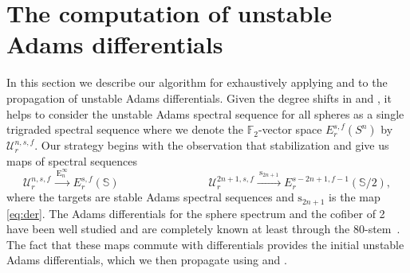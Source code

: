 \documentclass[dvipsnames,table]{amsart}
\theoremstyle{definition}
\theoremstyle{remark}
\numberwithin{equation}{section}
\begin{document}
\section{The computation of unstable Adams differentials}
\label{sec:ehp}

\noindent In this section we describe our algorithm for exhaustively applying  and  to the propagation of unstable Adams differentials. Given the degree shifts in  and , it helps to consider the unstable Adams spectral sequence for all spheres as a single trigraded spectral sequence where we denote the $\mathbb{F}_2$-vector space $E_r^{s, f}(S^n)$ by $\mathcal{U}_r^{n, s, f}$. Our strategy begins with the observation that stabilization and  give us maps of spectral sequences
\begin{equation}
  \label{eq:stable}
  \mathcal{U}_r^{n, s, f} \xrightarrow{\;\mathrm{E}_n^\infty\;} E_r^{s, f}(\mathbb{S}) \qquad \qquad \qquad \qquad \mathcal{U}_r^{2n + 1, s, f} \xrightarrow{\;\mathrm{s}_{2n+1}\;} E_r^{s - 2n + 1, f - 1}(\mathbb{S}/2),
\end{equation}
where the targets are stable Adams spectral sequences and $\mathrm{s}_{2n + 1}$ is the map \eqref{eq:der}. The Adams differentials for the sphere spectrum and the cofiber of 2 have been well studied and are completely known at least through the 80-stem~\cite{Isaksen_Wang_Xu_2023, Lin_Wang_Xu_2024, Lin_Wang_Xu_2025}. The fact that these maps commute with differentials provides the initial unstable Adams differentials, which we then propagate using  and .  
\end{document}
